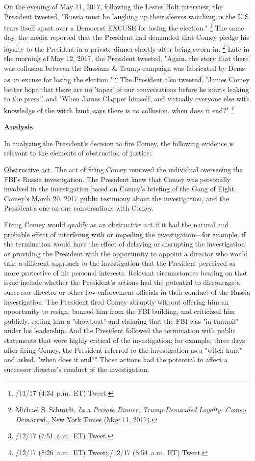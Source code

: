 {On the evening of May 11, 2017, following the Lester Holt interview, the President tweeted, "Russia must be laughing up their sleeves watching as the U.S. tears itself apart over a Democrat EXCUSE for losing the election."%
\footnote{/11/17 (4:34~p.m.~ET) Tweet.}
The same day, the media reported that the President had demanded that Comey pledge his loyalty to the President in a private dinner shortly after being sworn in.%
\footnote{Michael S. Schmidt, \textit{In a Private Dinner, Trump Demanded Loyalty. Comey Demurred.}, New York Times (May 11, 2017).}
Late in the morning of May 12, 2017, the President tweeted, "Again, the story that there was collusion between the Russians \& Trump campaign was fabricated by Dems as an excuse for losing the election."%
\footnote{/12/17 (7:51~a.m.~ET) Tweet.}
The President also tweeted, "James Comey better hope that there are no 'tapes' of our conversations before he starts leaking to the press!" and "When James Clapper himself, and virtually everyone else with knowledge of the witch hunt, says there is no collusion, when does it end?"%
\footnote{/12/17 (8:26~a.m.~ET) Tweet;
/12/17 (8:54~a.m.~ET) Tweet.}

\begin{center}
\textbf{Analysis}
\end{center}

In analyzing the President's decision to fire Comey, the following evidence is relevant to the elements of obstruction of justice:

\underline{Obstructive act.}
The act of firing Comey removed the individual overseeing the FBI's Russia investigation.
The President knew that Comey was personally involved in the investigation based on Comey's briefing of the Gang of Eight, Comey's March 20, 2017 public testimony about the investigation, and the President's one-on-one conversations with Comey.

Firing Comey would qualify as an obstructive act if it had the natural and probable effect of interfering with or impeding the investigation---for example, if the termination would have the effect of delaying or disrupting the investigation or providing the President with the opportunity to appoint a director who would take a different approach to the investigation that the President perceived as more protective of his personal interests.
Relevant circumstances bearing on that issue include whether the President's actions had the potential to discourage a successor director or other law enforcement officials in their conduct of the Russia investigation.
The President fired Comey abruptly without offering him an opportunity to resign, banned him from the FBI building, and criticized him publicly, calling him a "showboat" and claiming that the FBI was "in turmoil" under his leadership.
And the President followed the termination with public statements that were highly critical of the investigation;
for example, three days after firing Comey, the President referred to the investigation as a "witch hunt" and asked, "when does it end?"
Those actions had the potential to affect a successor director's conduct of the investigation.

}
